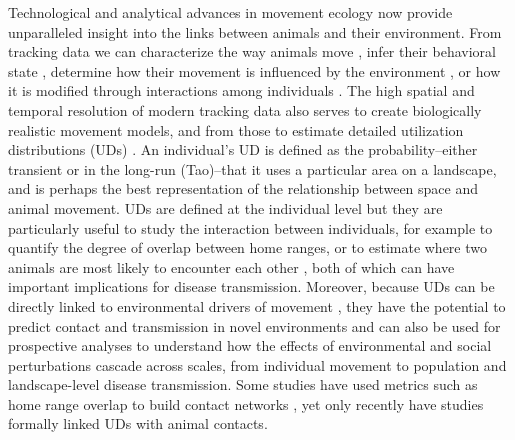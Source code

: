 \documentclass[letterpaper]{article}
\begin{document}
Technological and analytical advances in movement ecology now provide unparalleled insight into the links between animals and their environment. 
From tracking data we can characterize the way animals move \citep{Abrahms2017}, infer their behavioral state \citep{Langrock2012}, determine how their movement is influenced by the environment \citep{Avgar2015,Potts2022}, or how it is modified through interactions among individuals \citep{Scharf2016, Scharf2018}. 
The high spatial and temporal resolution of modern tracking data also serves to create biologically realistic movement models, and from those to estimate detailed utilization distributions (UDs) \citep{Fleming2014,Gurarie2011,Potts2023}.
An individual's UD is defined as the probability--either transient or in the long-run (Tao)--that it uses a particular area on a landscape, and is perhaps the best representation of the relationship between space and animal movement. 
UDs are defined at the individual level but they are particularly useful to study the interaction between individuals, for example to quantify the degree of overlap between home ranges, or to estimate where two animals are most likely to encounter each other \citep{Noonan2021}, both of which can have important implications for disease transmission. 
Moreover, because UDs can be directly linked to environmental drivers of movement \citep{Signer2017}, they have the potential to predict contact and transmission in novel environments and can also be used for prospective analyses to understand how the effects of environmental and social perturbations cascade across scales, from individual movement to population and landscape-level disease transmission. 
Some studies have used metrics such as home range overlap to build contact networks \citep{Godfrey2010, Godfrey2013}, yet only recently have studies formally linked UDs with animal contacts.


\end{document}
